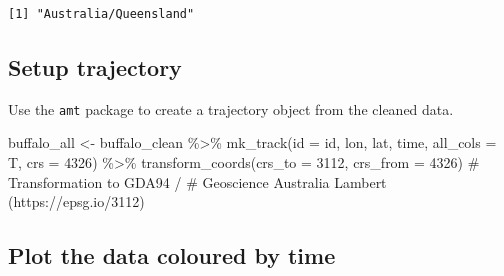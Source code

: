 \documentclass[
  letterpaper,
  DIV=11,
  numbers=noendperiod]{scrartcl}
\newenvironment{Shaded}{\begin{snugshade}}{\end{snugshade}}
\newcommand{\AttributeTok}[1]{\textcolor[rgb]{0.40,0.45,0.13}{#1}}
\newcommand{\CommentTok}[1]{\textcolor[rgb]{0.37,0.37,0.37}{#1}}
\newcommand{\DecValTok}[1]{\textcolor[rgb]{0.68,0.00,0.00}{#1}}
\newcommand{\FunctionTok}[1]{\textcolor[rgb]{0.28,0.35,0.67}{#1}}
\newcommand{\NormalTok}[1]{\textcolor[rgb]{0.00,0.23,0.31}{#1}}
\newcommand{\OtherTok}[1]{\textcolor[rgb]{0.00,0.23,0.31}{#1}}
\newcommand{\SpecialCharTok}[1]{\textcolor[rgb]{0.37,0.37,0.37}{#1}}
\begin{document}
\begin{Shaded}
\end{Shaded}

\begin{verbatim}
[1] "Australia/Queensland"
\end{verbatim}

\begin{Shaded}
\end{Shaded}

\subsection{Setup trajectory}\label{setup-trajectory}

Use the \texttt{amt} package to create a trajectory object from the
cleaned data.

\begin{Shaded}
\begin{Highlighting}[]
\NormalTok{buffalo\_all }\OtherTok{\textless{}{-}}\NormalTok{ buffalo\_clean }\SpecialCharTok{\%\textgreater{}\%} \FunctionTok{mk\_track}\NormalTok{(}\AttributeTok{id =}\NormalTok{ id,}
\NormalTok{                                           lon,}
\NormalTok{                                           lat, }
\NormalTok{                                           time, }
                                           \AttributeTok{all\_cols =}\NormalTok{ T,}
                                           \AttributeTok{crs =} \DecValTok{4326}\NormalTok{) }\SpecialCharTok{\%\textgreater{}\%} 
  \FunctionTok{transform\_coords}\NormalTok{(}\AttributeTok{crs\_to =} \DecValTok{3112}\NormalTok{, }\AttributeTok{crs\_from =} \DecValTok{4326}\NormalTok{) }\CommentTok{\# Transformation to GDA94 / }
\CommentTok{\# Geoscience Australia Lambert (https://epsg.io/3112)}
\end{Highlighting}
\end{Shaded}

\subsection{Plot the data coloured by
time}\label{plot-the-data-coloured-by-time}
\end{document}
